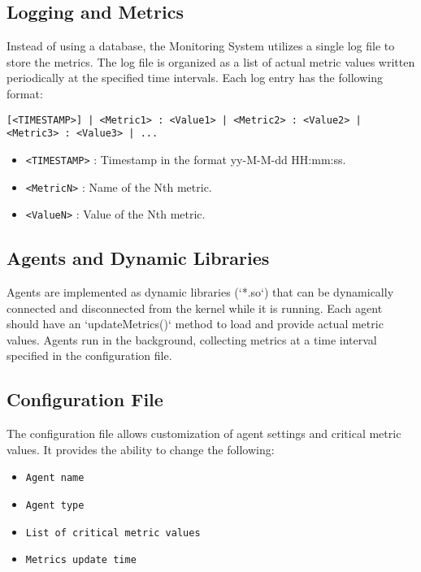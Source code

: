 \documentclass[12pt, letterpaper]{article}
\begin{document}
\subsection{Logging and Metrics}
Instead of using a database, the Monitoring System utilizes a single log file to store the metrics. The log file is organized as a list of actual metric values written periodically at the specified time intervals. Each log entry has the following format:
\begin{verbatim}
[<TIMESTAMP>] | <Metric1> : <Value1> | <Metric2> : <Value2> | <Metric3> : <Value3> | ...
\end{verbatim}
\begin{itemize}
    \item \texttt{<TIMESTAMP>} : Timestamp in the format yy-M-M-dd HH:mm:ss.
    \item \texttt{<MetricN>} : Name of the Nth metric.
    \item \texttt{<ValueN>} : Value of the Nth metric.
\end{itemize}

\subsection{Agents and Dynamic Libraries}
Agents are implemented as dynamic libraries (`*.so`) that can be dynamically connected and disconnected from the kernel while it is running. Each agent should have an `updateMetrics()` method to load and provide actual metric values. Agents run in the background, collecting metrics at a time interval specified in the configuration file.

\subsection{Configuration File}
The configuration file allows customization of agent settings and critical metric values. It provides the ability to change the following:
\begin{itemize}
    \item \texttt{Agent name}
    \item \texttt{Agent type}
    \item \texttt{List of critical metric values}
    \item \texttt{Metrics update time}
\end{itemize}
\end{document}
